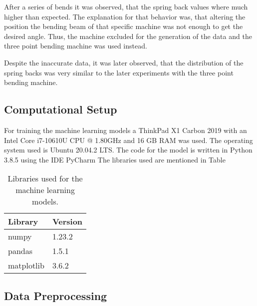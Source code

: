 After a series of bends it was observed, that the spring back values where much higher than expected. The explanation for that behavior was, that altering the position the bending beam of that specific machine was not enough to get the desired angle. Thus, the machine excluded for the generation of the data and the three point bending machine was used instead.

Despite the inaccurate data, it was later observed, that the distribution of the spring backs was very similar to the later experiments with the three point bending machine.

\subsection{Computational Setup}
For training the machine learning models a ThinkPad X1 Carbon 2019 with an Intel Core i7-10610U CPU @ 1.80GHz and 16 GB RAM was used. The operating system used is Ubuntu 20.04.2 LTS. The code for the model is written in Python 3.8.5 using the IDE PyCharm The libraries used are mentioned in Table

\begin{table}[H]
    \centering
    \begin{tabular}{|ll|}
        \hline
        \textbf{Library} & \textbf{Version} \\
        \hline
        numpy        & 1.23.2  \\
        pandas       & 1.5.1   \\
        matplotlib   & 3.6.2  \\ \hline 
    \end{tabular}
    \label{table:libraries}
    \caption{Libraries used for the machine learning models.}
\end{table}

\subsection{Data Preprocessing}

